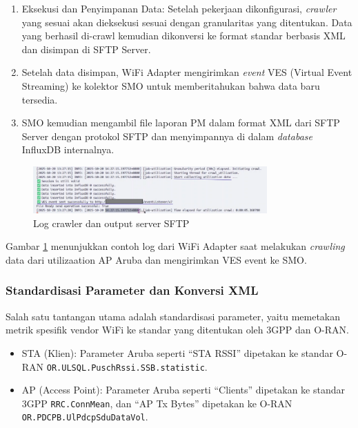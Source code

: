 \begin{enumerate}
    \item Eksekusi dan Penyimpanan Data: Setelah pekerjaan dikonfigurasi, \textit{crawler} yang sesuai akan dieksekusi sesuai dengan granularitas yang ditentukan. Data yang berhasil di-crawl kemudian dikonversi ke format standar berbasis XML dan disimpan di SFTP Server.
    \item Setelah data disimpan, WiFi Adapter mengirimkan \textit{event} VES (Virtual Event Streaming) ke kolektor SMO untuk memberitahukan bahwa data baru tersedia.
    \item SMO kemudian mengambil file laporan PM dalam format XML dari SFTP Server dengan protokol SFTP dan menyimpannya di dalam \textit{database} InfluxDB internalnya.
\end{enumerate}

\begin{figure}[htbp]
    \centering
    \includegraphics[width=0.8\textwidth]{assets/pics/crawler_log.png}
    \caption{Log crawler dan output server SFTP}
    \label{fig:crawler_log}
\end{figure}

Gambar \ref{fig:crawler_log} menunjukkan contoh log dari WiFi Adapter saat melakukan \textit{crawling} data dari utilizaation AP Aruba dan mengirimkan VES event ke SMO.

\subsubsection{Standardisasi Parameter dan Konversi XML}

Salah satu tantangan utama adalah standardisasi parameter, yaitu memetakan metrik spesifik vendor WiFi ke standar yang ditentukan oleh 3GPP dan O-RAN.

\begin{itemize}
    \item STA (Klien): Parameter Aruba seperti ``STA RSSI'' dipetakan ke standar O-RAN \texttt{OR.ULSQL.PuschRssi.SSB.statistic}.
    \item AP (Access Point): Parameter Aruba seperti ``Clients'' dipetakan ke standar 3GPP \texttt{RRC.ConnMean}, dan ``AP Tx Bytes'' dipetakan ke O-RAN \texttt{OR.PDCPB.UlPdcpSduDataVol}.
\end{itemize}

